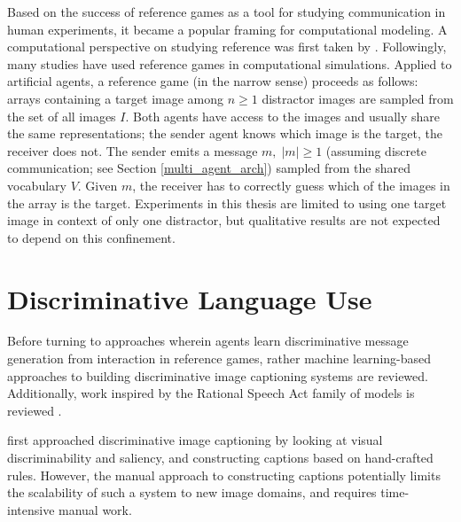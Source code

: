 Based on the success of reference games as a tool for studying communication in human experiments, it became a popular framing for computational modeling. A computational perspective on studying reference was first taken by \cite{dale1995computational}. Followingly, many studies have used reference games in computational simulations. Applied to artificial agents, a reference game (in the narrow sense) proceeds as follows: arrays containing a target image among $n \geq 1$ distractor images are sampled from the set of all images $I$. Both agents have access to the images and usually share the same representations; the sender agent knows which image is the target, the receiver does not. The sender emits a message $m, \; |m| \geq 1$ (assuming discrete communication; see Section \ref{multi_agent_arch}) sampled from the shared vocabulary $V$. Given $m$, the receiver has to correctly guess which of the images in the array is the target. Experiments in this thesis are limited to using one target image in context of only one distractor, but qualitative results are not expected to depend on this confinement.


\section{Discriminative Language Use}
\label{discriminative_lang}

Before turning to approaches wherein agents learn discriminative message generation from interaction in reference games, rather machine learning-based approaches to building discriminative image captioning systems are reviewed. Additionally, work inspired by the Rational Speech Act family of models is reviewed \parencite{goodman2016pragmatic}.

\cite{sadovnik2012image} first approached discriminative image captioning by looking at visual discriminability and saliency, and constructing captions based on hand-crafted rules. However, the manual approach to constructing captions potentially limits the scalability of such a system to new image domains, and requires time-intensive manual work. 


